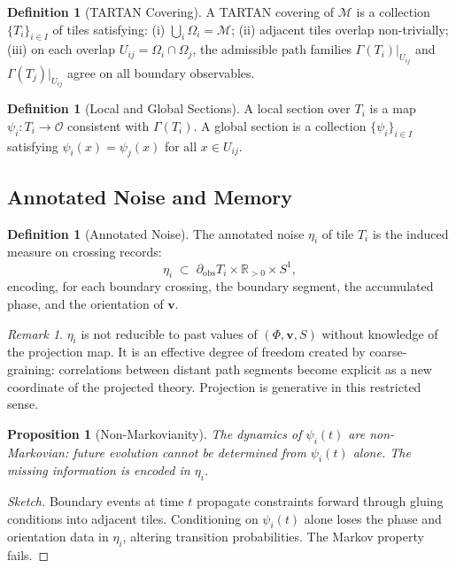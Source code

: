 \documentclass[11pt]{article}
\theoremstyle{plain}
\newtheorem{proposition}[theorem]{Proposition}
\theoremstyle{definition}
\newtheorem{definition}[theorem]{Definition}
\theoremstyle{remark}
\newtheorem{remark}[theorem]{Remark}
\newcommand{\vv}{\mathbf{v}}
\newcommand{\Ss}{S}
\newcommand{\M}{\mathcal{M}}
\begin{document}
\begin{definition}[TARTAN Covering]
A TARTAN covering of $\M$ is a collection $\{T_i\}_{i \in I}$ of tiles
satisfying: (i) $\bigcup_{i} \Omega_i = \M$; (ii) adjacent tiles overlap
non-trivially; (iii) on each overlap $U_{ij} = \Omega_i \cap \Omega_j$,
the admissible path families $\Gamma(T_i)|_{U_{ij}}$ and
$\Gamma(T_j)|_{U_{ij}}$ agree on all boundary observables.
\end{definition}

\begin{definition}[Local and Global Sections]
A local section over $T_i$ is a map $\psi_i : T_i \to \mathcal{O}$
consistent with $\Gamma(T_i)$. A global section is a collection
$\{\psi_i\}_{i \in I}$ satisfying $\psi_i(x) = \psi_j(x)$ for all
$x \in U_{ij}$.
\end{definition}

\subsection{Annotated Noise and Memory}

\begin{definition}[Annotated Noise]
The annotated noise $\eta_i$ of tile $T_i$ is the induced measure on
crossing records:
\[
  \eta_i \;\subset\; \partial_{\mathrm{obs}} T_i \times \mathbb{R}_{>0}
  \times S^1,
\]
encoding, for each boundary crossing, the boundary segment, the accumulated
phase, and the orientation of $\vv$.
\end{definition}

\begin{remark}
$\eta_i$ is not reducible to past values of $(\Phi,\vv,\Ss)$ without
knowledge of the projection map. It is an effective degree of freedom
created by coarse-graining: correlations between distant path segments
become explicit as a new coordinate of the projected theory. Projection
is generative in this restricted sense.
\end{remark}

\begin{proposition}[Non-Markovianity]
The dynamics of $\psi_i(t)$ are non-Markovian: future evolution cannot
be determined from $\psi_i(t)$ alone. The missing information is encoded
in $\eta_i$.
\end{proposition}

\begin{proof}[Sketch]
Boundary events at time $t$ propagate constraints forward through gluing
conditions into adjacent tiles. Conditioning on $\psi_i(t)$ alone loses
the phase and orientation data in $\eta_i$, altering transition probabilities.
The Markov property fails.
\end{proof}
\end{document}
